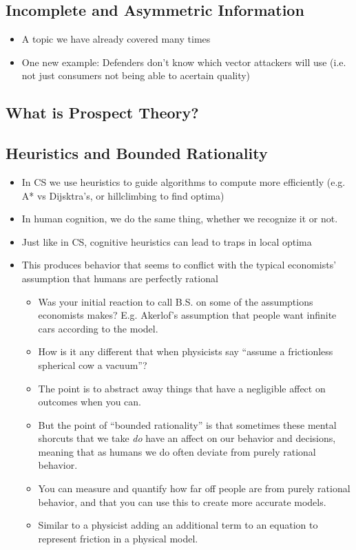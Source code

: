 \documentclass[11pt]{article}
\begin{document}
\subsection{Incomplete and Asymmetric Information}
\begin{itemize}
    \item A topic we have already covered many times
    \item One new example: Defenders don't know which vector attackers will use (i.e. not just consumers not being able to acertain quality)
\end{itemize}

\subsection{What is Prospect Theory?}

\subsection{Heuristics and Bounded Rationality}

\begin{itemize}
    \item In CS we use heuristics to guide algorithms to compute more efficiently (e.g. A* vs Dijsktra's, or hillclimbing to find optima)
    \item In human cognition, we do the same thing, whether we recognize it or not. 
    \item Just like in CS, cognitive heuristics can lead to traps in local optima
    \item This produces behavior that seems to conflict with the typical economists' assumption that humans are perfectly rational
    \begin{itemize}
        \item Was your initial reaction to call B.S. on some of the assumptions economists makes? E.g. Akerlof's assumption that people want infinite cars according to the model.
        \item How is it any different that when physicists say ``assume a frictionless spherical cow a vacuum''?
        \item The point is to abstract away things that have a negligible affect on outcomes when you can.
        \item But the point of ``bounded rationality'' is that sometimes these mental shorcuts that we take \textit{do} have an affect on our behavior and decisions, meaning that as humans we do often deviate from purely rational behavior.
        \item You can measure and quantify how far off people are from purely rational behavior, and that you can use this to create more accurate models.
        \item Similar to a physicist adding an additional term to an equation to represent friction in a physical model.
    \end{itemize}
\end{itemize}
\end{document}
